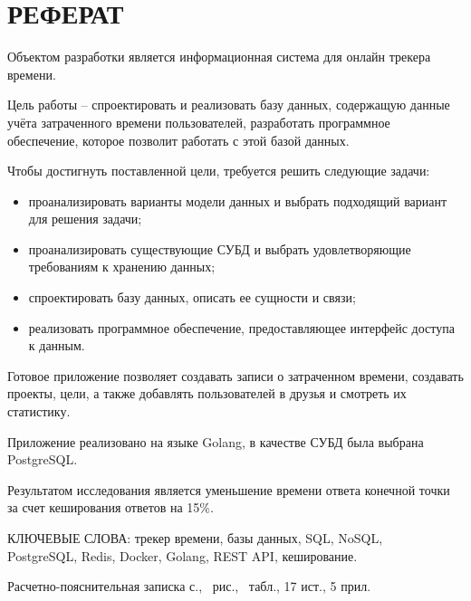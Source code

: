 \section*{РЕФЕРАТ}

Объектом разработки является информационная система для онлайн трекера времени.

Цель работы -- спроектировать и реализовать базу данных, содержащую данные учёта затраченного времени пользователей, разработать программное обеспечение, которое позволит работать с этой базой данных.

Чтобы достигнуть поставленной цели, требуется решить следующие задачи:
\begin{itemize}[leftmargin=1.6\parindent]
	\item проанализировать варианты модели данных и выбрать подходящий вариант для решения задачи;
	\item проанализировать существующие СУБД и выбрать удовлетворяющие требованиям к хранению данных;
	\item спроектировать базу данных, описать ее сущности и связи;
	\item реализовать программное обеспечение, предоставляющее интерфейс доступа к данным.
\end{itemize}

Готовое приложение позволяет создавать записи о затраченном времени, создавать проекты, цели, а также добавлять пользователей в друзья и смотреть их статистику.

Приложение реализовано на языке Golang, в качестве СУБД была выбрана PostgreSQL.

Результатом исследования является уменьшение времени ответа конечной точки за счет кеширования ответов на 15\%.

КЛЮЧЕВЫЕ СЛОВА: трекер времени, базы данных, SQL, NoSQL, \\PostgreSQL, Redis, Docker, Golang, REST API, кеширование.

Расчетно-пояснительная записка \pageref{LastPage} с., \totalfigures\ рис., \totaltables\ табл., 17 ист., 5 прил.

\pagebreak